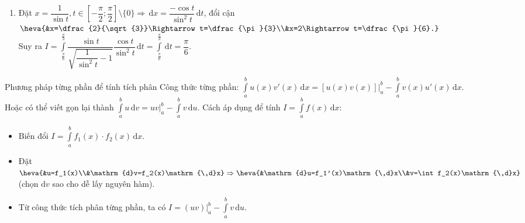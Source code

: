 \begin{ex}
{\begin{enumerate}
Đặt $x-1=\sin t$, $t\in\left[-\dfrac{\pi}{2};\dfrac{\pi}{2}\right]\Rightarrow\mathrm{\,d}x=\cos t\mathrm{\,d}t$, đổi cận $\heva{&x=0\Rightarrow t=-\dfrac{\pi}{2}\\&x=1\Rightarrow t=0.}$\\
Suy ra $I=\displaystyle\int\limits_{-\tfrac{\pi}{2}}^0\sqrt{1-\sin^2x}\cdot cost\mathrm{\,d}t=\displaystyle\int\limits_{-\tfrac{\pi}{2}}^0 cos^2t\mathrm{\,d}t=\displaystyle\int\limits_{-\tfrac{\pi}{2}}^0\dfrac{1+\cos 2t}{2}\mathrm{\,d}t=\dfrac{1}{2}t\bigg|_{-\tfrac{\pi}{2}}^0+\dfrac{1}{4}\sin 2t\bigg|_{-\tfrac{\pi}{2}}^0=\dfrac{\pi}{4}$.
\item Đặt $x=\dfrac{1}{\sin t}, t\in\left[-\dfrac{\pi}{2};\dfrac{\pi}{2}\right]\setminus\{0\}\Rightarrow\mathrm{\,d}x=\dfrac{-\cos t}{\sin^2t}\mathrm{\,d}t$, đổi cận $\heva{&x=\dfrac{2}{\sqrt{3}}\Rightarrow t=\dfrac{\pi}{3}\\&x=2\Rightarrow t=\dfrac{\pi}{6}.}$\\
Suy ra $I=\displaystyle\int\limits_{\tfrac{\pi}{6}}^{\tfrac{\pi}{3}}\dfrac{\sin t}{\sqrt{\dfrac{1}{\sin^2t}-1}}\dfrac{\cos t}{\sin^2t}\mathrm{\,d}t=\displaystyle\int\limits_{\tfrac{\pi}{6}}^{\tfrac{\pi}{3}}\mathrm{\,d}t=\dfrac{\pi}{6}$.
\end{enumerate}
}
\end{ex}
\begin{dang}{Phương pháp từng phần để tính tích phân}
	Công thức từng phần: $\displaystyle\int\limits_a^b u(x)v'(x)\mathrm{\,d}x=\left.[u(x)v(x)]\right|_a^b-\int\limits_a^b v(x)u'(x)\mathrm{\,d}x$.\\
	Hoặc có thể viết gọn lại thành $\displaystyle\int\limits_a^b u\mathrm{\,d}v=\left.uv\right|_a^b-\int\limits_a^b v\mathrm{\,d}u$. Cách áp dụng để tính $I=\displaystyle\int\limits_a^b f(x)\mathrm{\,d}x$:
	\begin{itemize}
		\item Biến đổi $I=\displaystyle\int\limits_a^b f_1(x)\cdot f_2(x)\mathrm{\,d}x$.
		\item Đặt $\displaystyle\heva{&u=f_1(x)\\&\mathrm{d}v=f_2(x)\mathrm{\,d}x}\Rightarrow\heva{&\mathrm{d}u=f_1'(x)\mathrm{\,d}x\\&v=\int f_2(x)\mathrm{\,d}x}$ (chọn $\mathrm{d}v$ sao cho dễ lấy nguyên hàm).
		\item Từ công thức tích phân từng phần, ta có $\displaystyle I=\left.(uv)\right|_a^b-\int\limits_a^b v\mathrm{\,d}u$.
	\end{itemize}
\end{dang}
